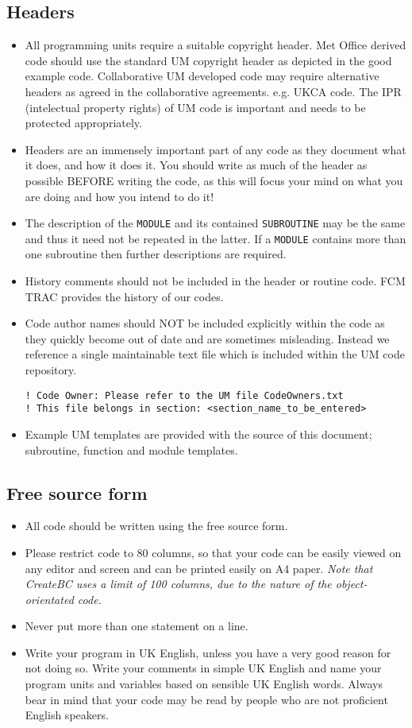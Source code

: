 \subsection{Headers}\label{sec:Copyright}
\begin{itemize}
\item All programming units require a suitable copyright header. Met Office derived
code should use the standard UM copyright header as depicted in the good example
code. Collaborative UM developed code may require alternative headers as agreed
in the collaborative agreements. e.g. UKCA code. The IPR (intelectual property
rights) of UM code is important and needs to be protected appropriately.
\item Headers are an immensely important part of any code as they document what it does,
and how it does it. You should write as much of the header as possible
BEFORE writing the code, as this will focus your mind
on what you are doing and how you intend to do it!
\item The description of the \verb|MODULE| and its contained \verb|SUBROUTINE| may be the same
and thus it need not be repeated in the latter. If a \verb|MODULE| contains more than one subroutine
then further descriptions are required.
\item History comments should not be included in the header or routine code. FCM TRAC provides the history of our codes.
\item Code author names should NOT be included explicitly within the code as they
quickly become out of date and are sometimes misleading. Instead we reference a
single maintainable text file which is included within the UM code repository.
\begin{verbatim}
! Code Owner: Please refer to the UM file CodeOwners.txt
! This file belongs in section: <section_name_to_be_entered>
\end{verbatim}
\item Example UM templates are provided with the source of this document;
subroutine, function and module templates.
\end{itemize}


\subsection{Free source form}\label{sec:80cols}
\begin{itemize}
\item All code should be written using the free source form.
\item Please restrict code to 80 columns, so that your code can be easily viewed on any
editor and screen and can be printed easily on A4 paper. {\it Note that CreateBC
uses a limit of 100 columns, due to the nature of the object-orientated code.}
\item Never put more than one statement on a line.
\item Write your program in UK English,
unless you have a very good reason for not doing so.
Write your comments in simple UK English and name your
program units and variables based on sensible UK English words.
Always bear in mind that your code may be read by people who
are not proficient English speakers.
\end{itemize}

